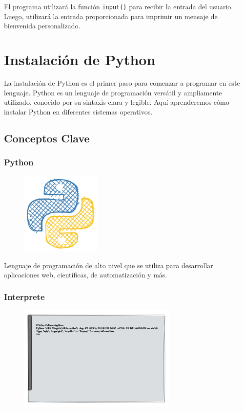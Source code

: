 \documentclass[
  a4paper,
  DIV=11,
  numbers=noendperiod,
  onepage,
  openany]{scrreprt}
\begin{document}
El programa utilizará la función \texttt{input()} para recibir la
entrada del usuario. Luego, utilizará la entrada proporcionada para
imprimir un mensaje de bienvenida personalizado.

\chapter{Instalación de Python}\label{instalaciuxf3n-de-python}

La instalación de Python es el primer paso para comenzar a programar en
este lenguaje. Python es un lenguaje de programación versátil y
ampliamente utilizado, conocido por su sintaxis clara y legible. Aquí
aprenderemos cómo instalar Python en diferentes sistemas operativos.

\section{Conceptos Clave}\label{conceptos-clave-1}

\subsection{Python}\label{python}

\begin{figure}

{\centering \includegraphics[width=1.5625in,height=\textheight]{unidades/unidad1/images/python.png}

}

\end{figure}

Lenguaje de programación de alto nivel que se utiliza para desarrollar
aplicaciones web, científicas, de automatización y más.

\subsection{Interprete}\label{interprete}

\begin{figure}

{\centering \includegraphics{unidades/unidad1/images/interprete.png}

}

\end{figure}
\end{document}
